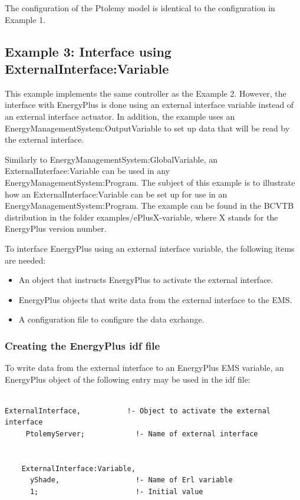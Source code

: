 The configuration of the Ptolemy model is identical to the configuration in Example 1.

\subsection{Example 3: Interface using ExternalInterface:Variable}\label{example-3-interface-using-externalinterfacevariable}

This example implements the same controller as the Example 2. However, the interface with EnergyPlus is done using an external interface variable instead of an external interface actuator. In addition, the example uses an EnergyManagementSystem:OutputVariable to set up data that will be read by the external interface.

Similarly to EnergyManagementSystem:GlobalVariable, an ExternalInterface:Variable can be used in any EnergyManagementSystem:Program. The subject of this example is to illustrate how an ExternalInterface:Variable can be set up for use in an EnergyManagementSystem:Program. The example can be found in the BCVTB distribution in the folder examples/ePlusX-variable, where X stands for the EnergyPlus version number.

To interface EnergyPlus using an external interface variable, the following items are needed:

\begin{itemize}
\item
  An object that instructs EnergyPlus to activate the external interface.
\item
  EnergyPlus objects that write data from the external interface to the EMS.
\item
  A configuration file to configure the data exchange.
\end{itemize}

\subsubsection{Creating the EnergyPlus idf file}\label{creating-the-energyplus-idf-file-2}

To write data from the external interface to an EnergyPlus EMS variable, an EnergyPlus object of the following entry may be used in the idf file:

\begin{lstlisting}

ExternalInterface,           !- Object to activate the external interface
     PtolemyServer;            !- Name of external interface


    ExternalInterface:Variable,
      yShade,                  !- Name of Erl variable
      1;                       !- Initial value
\end{lstlisting}

